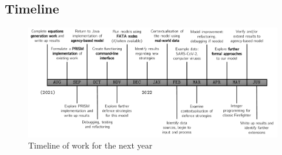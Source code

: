 \documentclass[../report.tex]{subfiles}
\begin{document}
\subsection{Timeline}

\begin{figure}[!ht]
\centering\includegraphics[width=\textwidth]{assets/timeline}
\caption{Timeline of work for the next year}
\end{figure}
\end{document}
